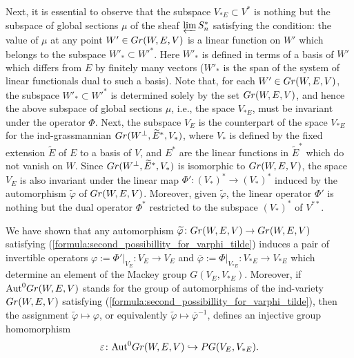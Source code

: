 \documentclass[11pt, a4paper]{article}
\begin{document}
Next, it is essential to observe that the subspace $V_{* E}\subset V^*$ is nothing but the subspace of global sections $\mu$ of the sheaf $\varprojlim S^*_n$ satisfying the condition: the value of %
$\mu$ at any point $W'\in Gr(W,E,V)$ is a linear function on $W'$ which belongs to the subspace $W'_*\subset {W'}^*$. Here $W'_*$ is defined in terms of a basis of $W'$ which differs from $E$ by finitely many vectors ($W'_*$ is the span of the system of linear functionals dual to such a basis). Note that, for each $W'\in Gr(W,E,V)$, the subspace $W'_*\subset W'^*$ is determined solely by the set $Gr(W,E,V)$, and hence the above subspace of global sections $\mu$, i.e., the space $V_{*E}$, must be invariant under the operator $\Phi$. %
Next, the subspace $V_E$ is the counterpart of the space $V_{*E}$ for the ind-grassmannian $Gr(W^\perp,\widetilde E^*,V_*)$, where $V_*$ is defined by the fixed extension $\widetilde{E}$ of $E$ to a basis of $V$, and $E^*$ are the linear functions in $\widetilde{E}^*$ which do not vanish on $W$. %
Since $Gr(W^\perp,\widetilde E^*,V_*)$ is isomorphic to $Gr(W,E,V)$, the space $V_E$ is also invariant under the linear map $\Phi'\colon (V_*)^*\rightarrow (V_*)^*$ induced by the automorphism $\widetilde{\varphi}$ of $Gr(W,E,V)$. Moreover, given $\widetilde{\varphi}$, the linear operator $\Phi'$ is nothing but the dual operator $\Phi^*$ restricted to the subspace $(V_*)^*$ of $V^{**}$.

We have shown that any automorphism $\widetilde{\varphi}\colon Gr(W,E,V)\rightarrow Gr(W,E,V)$ satisfying (\ref{formula:second_possibillity_for_varphi_tilde}) induces a pair of invertible operators $\varphi:=\Phi'|_{V_{E}}\colon V_E\rightarrow V_E$ and $\overline{\varphi}:=\Phi|_{V_{*E}}\colon V_{*E}\rightarrow V_{*E}$ which determine an element of the Mackey group $ G(V_E,V_{*E})$. Moreover, if $\mathrm{Aut}^0Gr(W,E,V)$ stands for the group of automorphisms of the ind-variety $Gr(W,E,V)$ satisfying (\ref{formula:second_possibillity_for_varphi_tilde}), then   the assignment $\widetilde{\varphi}\longmapsto \varphi$, or equivalently $\widetilde{\varphi}\longmapsto \overline{\varphi}^{-1}$, defines an injective group homomorphism $$\varepsilon \colon \mathrm{Aut}^0Gr(W,E,V)\hookrightarrow P G(V_E,V_{*E}).$$
\end{document}
